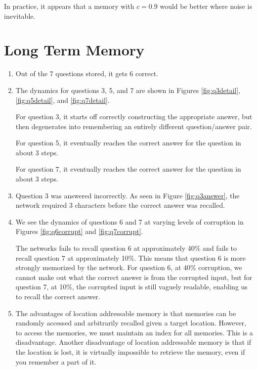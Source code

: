 \documentclass[11pt, oneside]{article}
\begin{document}
In practice, it appears that a memory with $c = 0.9$ would be better where noise is inevitable.

\section{Long Term Memory}

\begin{enumerate}
  \item Out of the 7 questions stored, it gets 6 correct.

  \item The dynamics for questions 3, 5, and 7 are shown in Figures \ref{fig:q3detail}, \ref{fig:q5detail}, and \ref{fig:q7detail}.

  For question 3, it starts off correctly constructing the appropriate answer, but then degenerates into remembering an entirely different question/answer pair.

  For question 5, it eventually reaches the correct answer for the question in about 3 steps.

  For question 7, it eventually reaches the correct answer for the question in about 3 steps.

  \item Question 3 was answered incorrectly. As seen in Figure \ref{fig:q3answer}, the network required 3 characters before the correct answer was recalled.

  \item We see the dynamics of questions 6 and 7 at varying levels of corruption in Figures \ref{fig:q6corrupt} and \ref{fig:q7corrupt}.

  The networks fails to recall question 6 at approximately 40\% and fails to recall question 7 at approximately 10\%. This means that question 6 is more strongly memorized by the network. For question 6, at 40\% corruption, we cannot make out what the correct answer is from the corrupted input, but for question 7, at 10\%, the corrupted input is still vaguely readable, enabling us to recall the correct answer.

  \item The advantages of location addressable memory is that memories can be randomly accessed and arbitrarily recalled given a target location. However, to access the memories, we must maintain an index for all memories. This is a disadvantage. Another disadvantage of location addressable memory is that if the location is lost, it is virtually impossible to retrieve the memory, even if you remember a part of it.


\end{enumerate}
\end{document}
